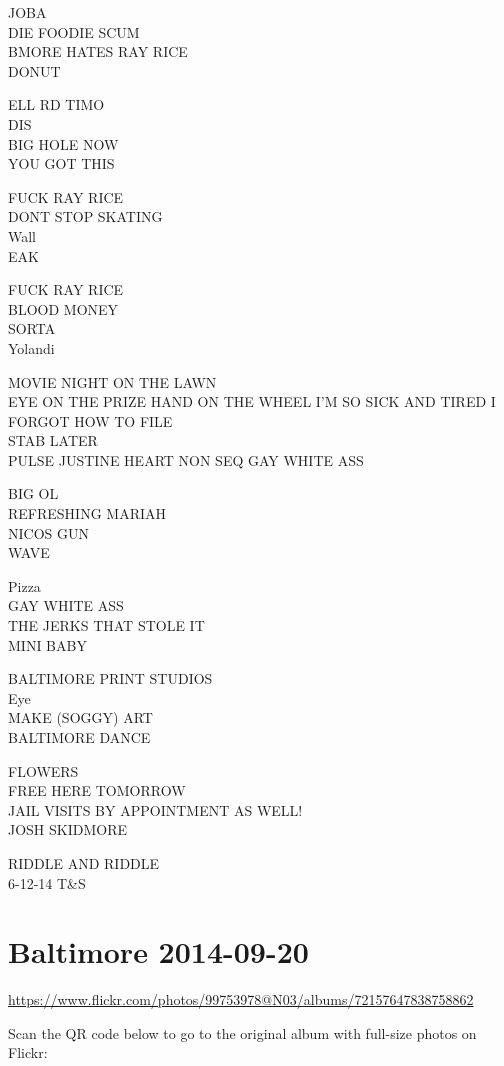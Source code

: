 \documentclass[10pt,letterpaper]{article}
\begin{document}
JOBA\\
DIE FOODIE SCUM\\
BMORE HATES RAY RICE\\
DONUT

ELL RD TIMO\\
DIS\\
BIG HOLE NOW\\
YOU GOT THIS

FUCK RAY RICE\\
DONT STOP SKATING\\
Wall\\
EAK

FUCK RAY RICE\\
BLOOD MONEY\\
SORTA\\
Yolandi

MOVIE NIGHT ON THE LAWN\\
EYE ON THE PRIZE HAND ON THE WHEEL I'M SO SICK AND TIRED I FORGOT HOW TO FILE\\
STAB LATER\\
PULSE JUSTINE HEART NON SEQ GAY WHITE ASS

BIG OL\\
REFRESHING MARIAH\\
NICOS GUN\\
WAVE

Pizza\\
GAY WHITE ASS\\
THE JERKS THAT STOLE IT\\
MINI BABY

BALTIMORE PRINT STUDIOS\\
Eye\\
MAKE (SOGGY) ART\\
BALTIMORE DANCE

FLOWERS\\
FREE HERE TOMORROW\\
JAIL VISITS BY APPOINTMENT AS WELL!\\
JOSH SKIDMORE

RIDDLE AND RIDDLE\\
6{-}12{-}14 T\&S


\section*{Baltimore 2014-09-20}

\url{https://www.flickr.com/photos/99753978@N03/albums/72157647838758862}

Scan the QR code below to go to the original album with full-size photos on Flickr:
\end{document}
